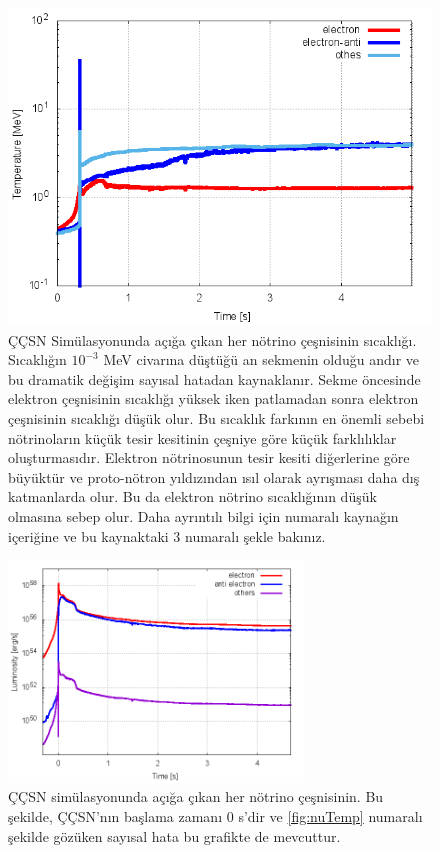 \begin{figure}[hbt!]
    \centering
    \includegraphics[width=\textwidth]{figures/nuTemperature}
    \caption[ÇÇSN Simülasyonunda Açığa Çıkan Her Nötrino Çeşnisinin Sıcaklığı]{ÇÇSN Simülasyonunda açığa çıkan her nötrino çeşnisinin sıcaklığı. Sıcaklığın $ 10^{-3} $ MeV civarına düştüğü an sekmenin olduğu andır ve bu dramatik değişim sayısal hatadan kaynaklanır. Sekme öncesinde elektron çeşnisinin sıcaklığı yüksek iken patlamadan sonra elektron çeşnisinin sıcaklığı düşük olur. Bu sıcaklık farkının en önemli sebebi nötrinoların küçük tesir kesitinin çeşniye göre küçük farklılıklar oluşturmasıdır. Elektron nötrinosunun tesir kesiti diğerlerine göre büyüktür ve proto-nötron yıldızından ısıl olarak ayrışması daha dış katmanlarda olur. Bu da elektron nötrino sıcaklığının düşük olmasına sebep olur. Daha ayrıntılı bilgi için \cite{Mathews:2014qba} numaralı kaynağın içeriğine ve bu kaynaktaki 3 numaralı şekle bakınız.}
    \label{fig:nuTemp}
\end{figure}
\begin{figure}[hbt!]
    \centering
    \includegraphics[width=0.7\textwidth]{figures/nuLuminosity}
    \caption[ÇÇSN Simülasyonunda Açığa Çıkan Her Nötrino Çeşnisinin Akısı.]{ÇÇSN simülasyonunda açığa çıkan her nötrino çeşnisinin. Bu şekilde, ÇÇSN'nın başlama zamanı $ 0 $ s'dir ve \eqref{fig:nuTemp} numaralı şekilde gözüken sayısal hata bu grafikte de mevcuttur.}
    \label{fig:nuLum}
\end{figure}

